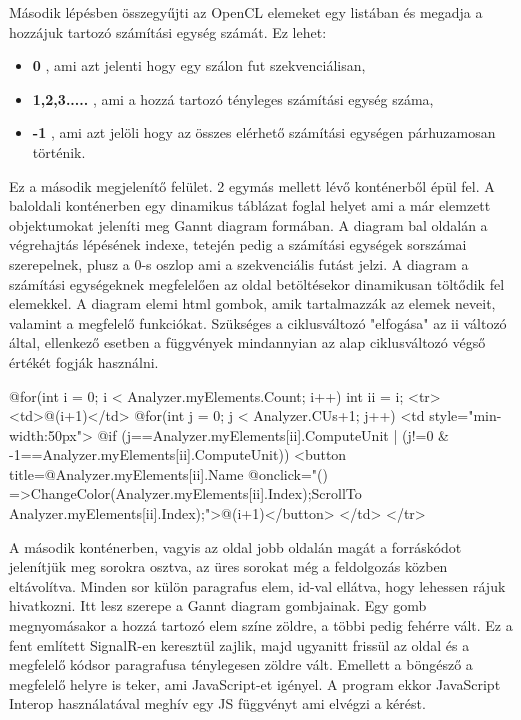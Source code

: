 Második lépésben összegyűjti az OpenCL elemeket egy listában és megadja a hozzájuk tartozó számítási egység számát. Ez lehet:
\begin{itemize}
\item\textbf{0} , ami azt jelenti hogy egy szálon fut szekvenciálisan,
\item\textbf{1,2,3.....} , ami a hozzá tartozó tényleges számítási egység száma,
\item\textbf{-1} , ami azt jelöli hogy az összes elérhető számítási egységen párhuzamosan történik.
\end{itemize}

Ez a második megjelenítő felület. 2 egymás mellett lévő konténerből épül fel.
A baloldali konténerben egy dinamikus táblázat foglal helyet ami a már elemzett objektumokat jeleníti meg Gannt diagram formában. A diagram bal oldalán a végrehajtás lépésének indexe, tetején pedig a számítási egységek sorszámai szerepelnek, plusz a 0-s oszlop ami a szekvenciális futást jelzi. A diagram a számítási egységeknek megfelelően az oldal betöltésekor dinamikusan töltődik fel elemekkel. A diagram elemi html gombok, amik tartalmazzák az elemek neveit, valamint a megfelelő funkciókat. Szükséges a ciklusváltozó "elfogása" az ii változó által, ellenkező esetben a függvények mindannyian az alap ciklusváltozó végső értékét fogják használni.

\begin{cpp}
@for(int i = 0; i < Analyzer.myElements.Count; i++)
 {
   int ii = i;
   <tr>
      <td>@(i+1)</td>
      @for(int j = 0; j < Analyzer.CUs+1; j++)
        {
          <td style="min-width:50px">
          @if (j==Analyzer.myElements[ii].ComputeUnit | (j!=0 &
               -1==Analyzer.myElements[ii].ComputeUnit))
             {
                <button title=@Analyzer.myElements[ii].Name @onclick="()
                =>{ChangeColor(Analyzer.myElements[ii].Index);ScrollTo
                Analyzer.myElements[ii].Index);}">@(i+1)</button>
             }
          </td>
        }
   </tr>
 }
\end{cpp}


A második konténerben, vagyis az oldal jobb oldalán magát a forráskódot jelenítjük meg sorokra osztva, az üres sorokat még a feldolgozás közben eltávolítva. Minden sor külön paragrafus elem, id-val ellátva, hogy lehessen rájuk hivatkozni. Itt lesz szerepe a Gannt diagram gombjainak. Egy gomb megnyomásakor a hozzá tartozó elem színe zöldre, a többi pedig fehérre vált. Ez a fent említett SignalR-en keresztül zajlik, majd ugyanitt frissül az oldal és a megfelelő kódsor paragrafusa ténylegesen zöldre vált. Emellett a böngésző a megfelelő helyre is teker, ami JavaScript-et igényel. A program ekkor JavaScript Interop használatával meghív egy JS függvényt ami elvégzi a kérést.

